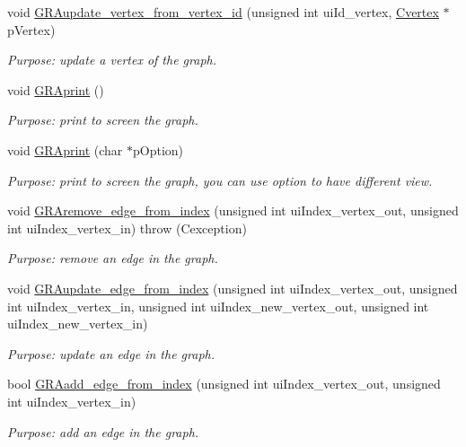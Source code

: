 \begin{DoxyCompactItemize}
void \hyperlink{class_cgraph_a902a9ad6561b0f4d5683a4778377461b}{G\+R\+Aupdate\+\_\+vertex\+\_\+from\+\_\+vertex\+\_\+id} (unsigned int ui\+Id\+\_\+vertex, \hyperlink{class_cvertex}{Cvertex} $\ast$p\+Vertex)
\begin{DoxyCompactList}\small\item\em Purpose\+: update a vertex of the graph. \end{DoxyCompactList}\item 
void \hyperlink{class_cgraph_a43c280add746a2aee6d6c09435d8da00}{G\+R\+Aprint} ()
\begin{DoxyCompactList}\small\item\em Purpose\+: print to screen the graph. \end{DoxyCompactList}\item 
void \hyperlink{class_cgraph_ac0f9c28d05f4ce98521d2a859fd5f540}{G\+R\+Aprint} (char $\ast$p\+Option)
\begin{DoxyCompactList}\small\item\em Purpose\+: print to screen the graph, you can use option to have different view. \end{DoxyCompactList}\item 
void \hyperlink{class_cgraph_a0be43dbf3a34b9ed7161dd11d81ba9a3}{G\+R\+Aremove\+\_\+edge\+\_\+from\+\_\+index} (unsigned int ui\+Index\+\_\+vertex\+\_\+out, unsigned int ui\+Index\+\_\+vertex\+\_\+in)  throw (\+Cexception)
\begin{DoxyCompactList}\small\item\em Purpose\+: remove an edge in the graph. \end{DoxyCompactList}\item 
void \hyperlink{class_cgraph_a399bfe930e7d73dff66fd9cc7321b8ba}{G\+R\+Aupdate\+\_\+edge\+\_\+from\+\_\+index} (unsigned int ui\+Index\+\_\+vertex\+\_\+out, unsigned int ui\+Index\+\_\+vertex\+\_\+in, unsigned int ui\+Index\+\_\+new\+\_\+vertex\+\_\+out, unsigned int ui\+Index\+\_\+new\+\_\+vertex\+\_\+in)
\begin{DoxyCompactList}\small\item\em Purpose\+: update an edge in the graph. \end{DoxyCompactList}\item 
bool \hyperlink{class_cgraph_a1154ecf975f57d2eecf7dbcabe850abf}{G\+R\+Aadd\+\_\+edge\+\_\+from\+\_\+index} (unsigned int ui\+Index\+\_\+vertex\+\_\+out, unsigned int ui\+Index\+\_\+vertex\+\_\+in)
\begin{DoxyCompactList}\small\item\em Purpose\+: add an edge in the graph. \end{DoxyCompactList}\item 

\end{DoxyCompactItemize}
